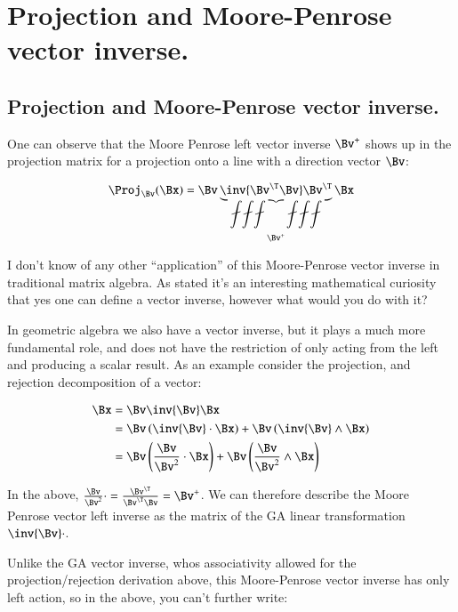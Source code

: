 \chapter{Projection and Moore-Penrose vector inverse.}
\label{chap:projectionAndMoorePenroseVectorInverse}
\date{May 16, 2008.  projectionAndMoorePenroseVectorInverse.tex}

\section{Projection and Moore-Penrose vector inverse. }

One can observe that the Moore Penrose left vector inverse $\Bv^+$ shows up in the projection matrix for a projection onto a line with a direction vector $\Bv$:

\begin{equation}
\Proj_\Bv(\Bx) = \Bv \underbrace{\inv{ \Bv^\T \Bv} \Bv^\T}_{\Bv^+} \Bx
\end{equation}

I don't know of any other ``application'' of this Moore-Penrose vector inverse in traditional matrix algebra.  As stated it's an interesting mathematical curiosity that yes one can define a vector inverse, however what would you do with it?

In geometric algebra we also have a vector inverse, but it plays a much more fundamental role, and does not have the restriction of only acting from the left and 
producing a scalar result.  As an example consider the projection, and rejection decomposition of a vector:

\begin{align*}
\Bx 
&= \Bv \inv{\Bv} \Bx \\
&= \Bv \left(\inv{\Bv} \cdot \Bx\right) + \Bv \left(\inv{\Bv} \wedge \Bx\right) \\
&= \Bv 
\left(
\frac{\Bv}{\Bv^2} \cdot 
 \Bx\right)
 + \Bv \left(\frac{\Bv}{\Bv^2} \wedge \Bx\right) \\
\end{align*}

In the above, $\frac{\Bv}{\Bv^2} \cdot = \frac{\Bv^\T}{\Bv^\T \Bv} = \Bv^+$.  We can therefore describe the Moore Penrose vector left inverse as the matrix of the GA linear transformation $\inv{\Bv} \cdot$.

Unlike the GA vector inverse, whos associativity allowed for the projection/rejection derivation above, this Moore-Penrose vector inverse has only left action, so in the above, you can't further write:


